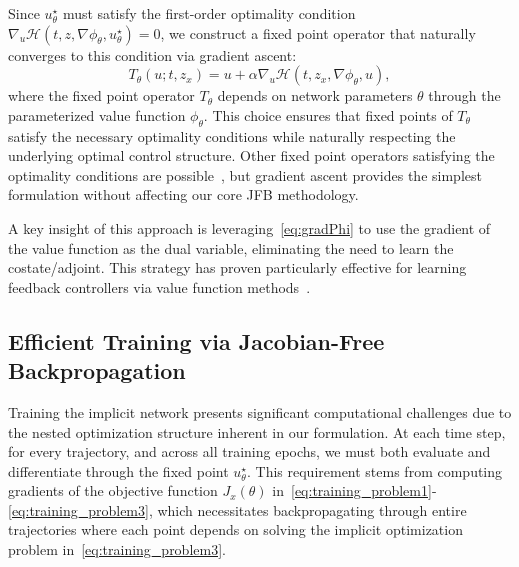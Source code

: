 \documentclass[letterpaper, 10 pt, conference]{ieeeconf}  %
\begin{document}
    Since $u_\theta^\star$ must satisfy the first-order optimality condition $\nabla_u \mathcal{H}(t,z,\nabla \phi_\theta, u_\theta^\star) = 0$, we construct a fixed point operator that naturally converges to this condition via gradient ascent:
    \begin{equation}
    \label{eq:T_theta}
        T_\theta(u; t, z_{x}) = u + \alpha \nabla_u \mathcal{H}(t,z_x,\nabla \phi_\theta, u),
    \end{equation}
    where the fixed point operator $T_\theta$ depends on network parameters $\theta$ through the parameterized value function $\phi_\theta$. This choice ensures that fixed points of $T_\theta$ satisfy the necessary optimality conditions while naturally respecting the underlying optimal control structure. Other fixed point operators satisfying the optimality conditions are possible~\cite{ryu2022large, mckenzie2024three, mckenzie2024differentiating}, but gradient ascent provides the simplest formulation without affecting our core JFB methodology.
    
    A key insight of this approach is leveraging~\eqref{eq:gradPhi} to use the gradient of the value function as the dual variable, eliminating the need to learn the costate/adjoint. This strategy has proven particularly effective for learning feedback controllers via value function methods~\cite{li2024neural, onken2022neural, onken2021ot, vidal2023taming}.

    \subsection{Efficient Training via Jacobian-Free Backpropagation}

    Training the implicit network presents significant computational challenges due to the nested optimization structure inherent in our formulation. At each time step, for every trajectory, and across all training epochs, we must both evaluate and differentiate through the fixed point $u^\star_\theta$. This requirement stems from computing gradients of the objective function $J_x(\theta)$ in~\eqref{eq:training_problem1}-\eqref{eq:training_problem3}, which necessitates backpropagating through entire trajectories where each point depends on solving the implicit optimization problem in~\eqref{eq:training_problem3}.
\end{document}
